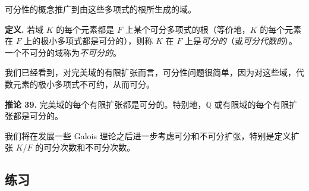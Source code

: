 可分性的概念推广到由这些多项式的根所生成的域。

\noindent\textbf{定义.} 若域 $K$ 的每个元素都是 $F$ 上某个可分多项式的根（等价地，$K$ 的每个元素在 $F$ 上的极小多项式都是可分的），则称 $K$ 在 $F$ 上是\emph{可分的}（或\emph{可分代数的}）。一个不可分的域称为\emph{不可分的}。

我们已经看到，对完美域的有限扩张而言，可分性问题很简单，因为对这些域，代数元素的极小多项式不可约，从而可分。

\noindent\textbf{推论 39.} 完美域的每个有限扩张都是可分的。特别地，$\mathbb Q$ 或有限域的每个有限扩张都是可分的。

我们将在发展一些 Galois 理论之后进一步考虑可分和不可分扩张，特别是定义扩张 $K/F$ 的可分次数和不可分次数。

\subsection*{练习}


